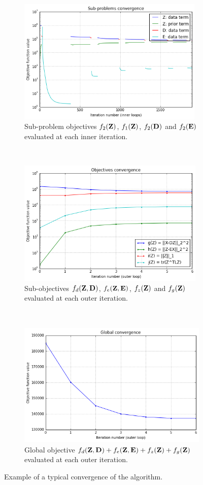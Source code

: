 \begin{figure}[ht]
	\centering
	\begin{subfigure}[b]{0.9\textwidth}
		\centering
		\includegraphics[height=6cm]{img/sub_problems}
		\caption{Sub-problem objectives $f_2(\mathbf{Z})$, $f_1(\mathbf{Z})$, $f_2(\mathbf{D})$ and $f_2(\mathbf{E})$ evaluated at each inner iteration.}
	\end{subfigure}
	\\
	\begin{subfigure}[b]{0.9\textwidth}
		\centering
		\includegraphics[height=6cm]{img/sub_objectives}
		\caption{Sub-objectives $f_d(\mathbf{Z}, \mathbf{D})$, $f_e(\mathbf{Z}, \mathbf{E})$, $f_z(\mathbf{Z})$ and $f_g(\mathbf{Z})$ evaluated at each outer iteration.}
	\end{subfigure}
	\\
	\begin{subfigure}[b]{0.9\textwidth}
		\centering
		\includegraphics[height=6cm]{img/objective}
		\caption{Global objective $f_d(\mathbf{Z}, \mathbf{D}) + f_e(\mathbf{Z}, \mathbf{E}) + f_z(\mathbf{Z}) + f_g(\mathbf{Z})$ evaluated at each outer iteration.}
	\end{subfigure}
	\caption[]{Example of a typical convergence of the algorithm.}
	\label{fig:convergence}
\end{figure}

